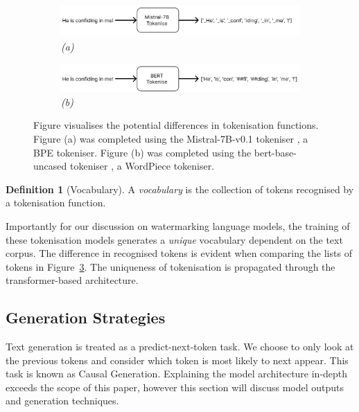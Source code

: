 \documentclass{l4proj}
\theoremstyle{definition}
\newtheorem{definition}{Definition}[section]
\newcommand{\codefont}[1]{{\fontfamily{lmtt}\selectfont #1}}
\begin{document}
        \begin{figure}[ht]
            \captionsetup[subfigure]{labelformat=empty}
            \centering
            \begin{subfigure}{\textwidth}
                \includegraphics[width=\linewidth]{images/background/tokenisation-process-mistral.png}
                \caption{\emph{(a)}}
                \label{fig:tokenisation-process-mistral}
            \end{subfigure}

            \begin{subfigure}{\textwidth}
                \includegraphics[width=\linewidth]{images/background/tokenisation-process-bert.png}
                \caption{\emph{(b)}}
                \label{fig:tokenisation-process-bert}
            \end{subfigure}

            \caption{Figure visualises the potential differences in tokenisation functions. Figure (a) was completed using the \codefont{Mistral-7B-v0.1} tokeniser \citep{jiang2023mistral}, a BPE tokeniser. Figure (b) was completed using the \codefont{bert-base-uncased} tokeniser \citep{DBLP:journals/corr/abs-1810-04805}, a WordPiece tokeniser.}
            \label{fig:tokenisation-process}
        \end{figure}

        \begin{definition}[Vocabulary]
            A \emph{vocabulary} is the collection of tokens recognised by a tokenisation function.
        \end{definition}

        Importantly for our discussion on watermarking language models, the training of these tokenisation models generates a \emph{unique} vocabulary dependent on the text corpus. The difference in recognised tokens is evident when comparing the lists of tokens in Figure~\ref{fig:tokenisation-process}. The uniqueness of tokenisation is propagated through the transformer-based architecture.
    
    \subsection{Generation Strategies}
        \label{sec:decoder-generation}
        Text generation is treated as a predict-next-token task. We choose to only look at the previous tokens and consider which token is most likely to next appear. This task is known as Causal Generation. Explaining the model architecture in-depth exceeds the scope of this paper, however this section will discuss model outputs and generation techniques. 
\end{document}
